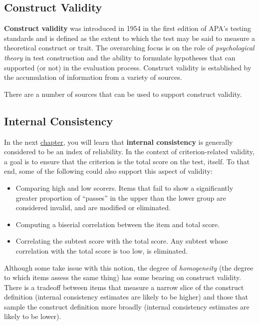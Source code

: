 \documentclass[
  english,
]{book}
\providecommand{\tightlist}{%
  \setlength{\itemsep}{0pt}\setlength{\parskip}{0pt}}
\begin{document}
\hypertarget{construct-validity}{%
\subsection{Construct Validity}\label{construct-validity}}

\textbf{Construct validity} was introduced in 1954 in the first edition of APA's testing standards and is defined as the extent to which the test may be said to measure a theoretical construct or trait. The overarching focus is on the role of \emph{psychological theory} in test construction and the ability to formulate hypotheses that can supported (or not) in the evaluation process. Construct validity is established by the accumulation of information from a variety of sources.

There are a number of sources that can be used to support construct validity.

\hypertarget{internal-consistency}{%
\subsection{Internal Consistency}\label{internal-consistency}}

In the next \protect\hyperlink{rxx}{chapter}, you will learn that \textbf{internal consistency} is generally considered to be an index of reliability. In the context of criterion-related validity, a goal is to ensure that the criterion is the total score on the test, itself. To that end, some of the following could also support this aspect of validity:

\begin{itemize}
\tightlist
\item
  Comparing high and low scorers. Items that fail to show a significantly greater proportion of ``passes'' in the upper than the lower group are considered invalid, and are modified or eliminated.
\item
  Computing a biserial correlation between the item and total score.\\
\item
  Correlating the subtest score with the total score. Any subtest whose correlation with the total score is too low, is eliminated.
\end{itemize}

Although some take issue with this notion, the degree of \emph{homogeneity} (the degree to which items assess the same thing) has some bearing on construct validity. There is a tradeoff between items that measure a narrow slice of the construct definition (internal consistency estimates are likely to be higher) and those that sample the construct definition more broadly (internal consistency estimates are likely to be lower).
\end{document}
